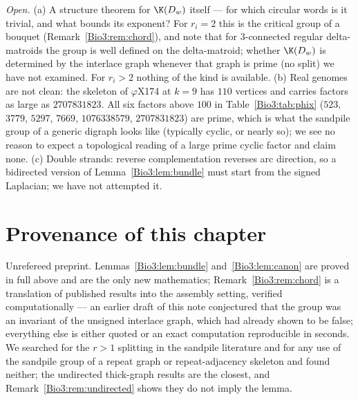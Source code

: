 \emph{Open.} (a) A structure theorem for $\K(D_w)$ itself --- for which circular words is
it trivial, and what bounds its exponent? For $r_i=2$ this is the critical group of a
bouquet (Remark~\ref{Bio3:rem:chord}), and \cite{MMN} note that for $3$-connected regular
delta-matroids the group is well defined on the delta-matroid; whether $\K(D_w)$ is
determined by the interlace graph whenever that graph is prime (no split) we have not
examined. For $r_i>2$ nothing of the kind is available. (b) Real genomes are not clean: the
skeleton of $\varphi$X174 at $k=9$ has $110$ vertices and carries factors as large as
$2707831823$. All six factors above $100$ in Table~\ref{Bio3:tab:phix} ($523$, $3779$, $5297$,
$7669$, $1076338579$, $2707831823$) are prime, which is what the sandpile group of a
generic digraph looks like (typically cyclic, or nearly so); we see no reason to expect a
topological reading of a large prime cyclic factor and claim none. (c) Double strands: reverse complementation reverses arc
direction, so a bidirected version of Lemma~\ref{Bio3:lem:bundle} must start from the signed
Laplacian; we have not attempted it.

\section*{Provenance of this chapter}

Unrefereed preprint. Lemmas~\ref{Bio3:lem:bundle} and~\ref{Bio3:lem:canon} are proved in full
above and are the only new mathematics; Remark~\ref{Bio3:rem:chord} is a translation of
published results \cite{ABS,MMN} into the assembly setting, verified computationally ---
an earlier draft of this note conjectured that the group was an invariant of the unsigned
interlace graph, which \cite[Rem.~6.7]{MMN} had already shown to be false; everything
else is either quoted or an exact computation reproducible in seconds. We searched for the $r>1$ splitting in the sandpile literature and for any use of
the sandpile group of a repeat graph or repeat-adjacency skeleton and found neither; the
undirected thick-graph results \cite{ChenSchedler,Alar} are the closest, and
Remark~\ref{Bio3:rem:undirected} shows they do not imply the lemma.
